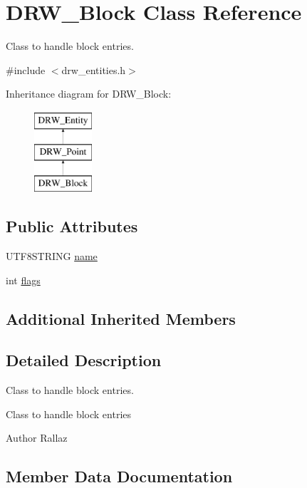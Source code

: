\hypertarget{class_d_r_w___block}{}\section{D\+R\+W\+\_\+\+Block Class Reference}
\label{class_d_r_w___block}


Class to handle block entries.  




{\ttfamily \#include $<$drw\+\_\+entities.\+h$>$}

Inheritance diagram for D\+R\+W\+\_\+\+Block\+:\begin{figure}[H]
\begin{center}
\leavevmode
\includegraphics[height=3.000000cm]{da/d3b/class_d_r_w___block}
\end{center}
\end{figure}
\subsection*{Public Attributes}
\begin{DoxyCompactItemize}
\item 
U\+T\+F8\+S\+T\+R\+I\+N\+G \hyperlink{class_d_r_w___block_a574a37d634655f8ea5526a80e842a66a}{name}
\item 
int \hyperlink{class_d_r_w___block_a17bb4c01376f4b30b8d3ce36863b3ae3}{flags}
\end{DoxyCompactItemize}
\subsection*{Additional Inherited Members}


\subsection{Detailed Description}
Class to handle block entries. 

Class to handle block entries \begin{DoxyAuthor}{Author}
Rallaz 
\end{DoxyAuthor}


\subsection{Member Data Documentation}
\hypertarget{class_d_r_w___block_a17bb4c01376f4b30b8d3ce36863b3ae3}{}
